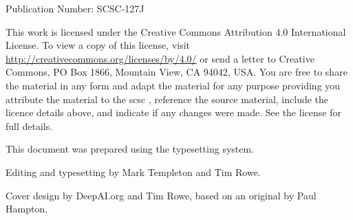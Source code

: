 %
%

%
%

\pagestyle{FirstPageFrontCover}
%
%



 Publication Number: SCSC-127J

This work is licensed under the Creative Commons Attribution 4.0 International License. To view a copy of this license, visit \href{http://creativecommons.org/licenses/by/4.0/}{http://creativecommons.org/licenses/by/4.0/} or send a letter to Creative Commons, PO Box 1866, Mountain View, CA 94042, USA\@. You are free to share the material in any form and adapt the material for any purpose providing you attribute the material to the \gls{scsc} , reference the source material, include the licence details above, and indicate if any changes were made.  See the license for full details.

This document was prepared using the \LaTeXe\/ typesetting system.

Editing and typesetting by Mark Templeton and Tim Rowe.

Cover design by DeepAI.org and Tim Rowe, based on an original by Paul Hampton.



\clearpage
\pagestyle{ContinuationInsideFrontCover}

